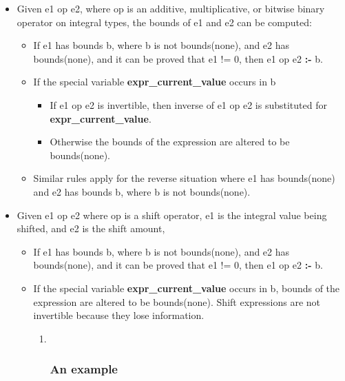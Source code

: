 \documentclass[]{article}
\begin{document}
\begin{itemize}
\item
  Given e1 op e2, where op is an additive, multiplicative, or bitwise
  binary operator on integral types, the bounds of e1 and e2 can be
  computed:

  \begin{itemize}
  \item
    If e1 has bounds b, where b is not bounds(none), and e2 has
    bounds(none), and it can be proved that e1 != 0, then e1 op e2
    \textbf{:-} b.
  \item
    If the special variable \textbf{expr\_current\_value} occurs in b

    \begin{itemize}
    \item
      If e1 op e2 is invertible, then inverse of e1 op e2 is substituted
      for \textbf{expr\_current\_value}.
    \item
      Otherwise the bounds of the expression are altered to be
      bounds(none).
    \end{itemize}
  \item
    Similar rules apply for the reverse situation where e1 has
    bounds(none) and e2 has bounds b, where b is not bounds(none).
  \end{itemize}
\item
  Given e1 op e2 where op is a shift operator, e1 is the integral value
  being shifted, and e2 is the shift amount,

  \begin{itemize}
  \item
    If e1 has bounds b, where b is not bounds(none), and e2 has
    bounds(none), and it can be proved that e1 != 0, then e1 op e2
    \textbf{:-} b.
  \item
    If the special variable \textbf{expr\_current\_value} occurs in b,
    bounds of the expression are altered to be bounds(none). Shift
    expressions are not invertible because they lose information.

    \begin{enumerate}
    \def\labelenumi{\arabic{enumi}.}
    \item ~
      \subsubsection{An example}\label{an-example-1}
    \end{enumerate}
  \end{itemize}
\end{itemize}
\end{document}
